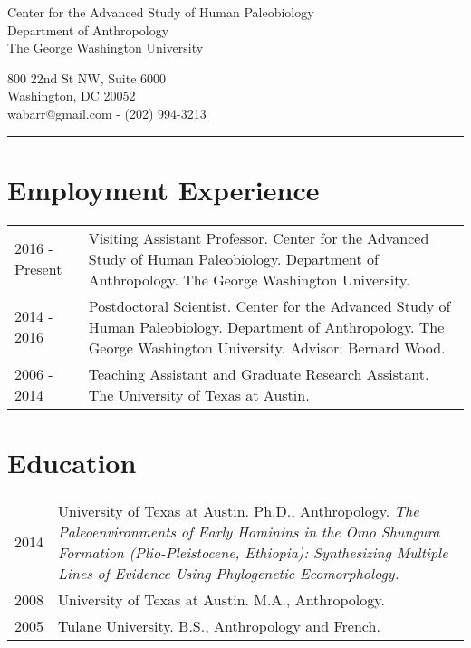 \documentclass{article}
\begin{document}
\begin{center}
\end{center}

\vspace{15pt}

\noindent\begin{minipage}{.60\textwidth}
\begin{flushleft}
Center for the Advanced Study of Human Paleobiology\\
Department of Anthropology\\
The George Washington University\\
\end{flushleft}
\end{minipage}
\begin{minipage}{.395\textwidth}
\begin{flushright}
800 22nd St NW, Suite 6000\\
Washington, DC 20052 \\
wabarr@gmail.com - (202) 994-3213\\
\end{flushright}
\end{minipage}


\noindent\rule[-2mm]{\textwidth}{1pt}

\section*{Employment Experience}
\begin{tabular}{p{}p{}}
2016 - Present & Visiting Assistant Professor. Center for the Advanced Study of Human Paleobiology. Department of Anthropology. The George Washington University.\\[4pt]
2014 - 2016 & Postdoctoral Scientist. Center for the Advanced Study of Human Paleobiology. Department of Anthropology. The George Washington University. Advisor: Bernard Wood.\\[4pt]
2006 - 2014 & Teaching Assistant and Graduate Research Assistant. The University of Texas at Austin.

\end{tabular}

\section*{Education}
\begin{tabular}{p{}p{}}
2014 & University of Texas at Austin. Ph.D., Anthropology. \emph{The Paleoenvironments of Early Hominins in the Omo Shungura Formation (Plio-Pleistocene, Ethiopia): Synthesizing Multiple Lines of Evidence Using Phylogenetic Ecomorphology.}\\[4pt]
2008 & University of Texas at Austin. M.A., Anthropology. \\[4pt]
2005 & Tulane University. B.S., Anthropology and French.\\
\end{tabular}
\end{document}
